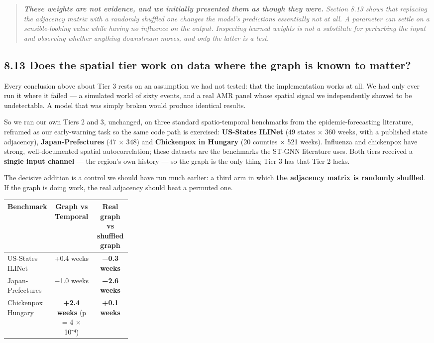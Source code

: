 \documentclass[11pt,a4paper]{article}
\begin{document}
\begin{quote}\emph{\textbf{These weights are not evidence, and we initially presented them as though they were.} Section 8.13 shows that replacing the adjacency matrix with a randomly shuffled one changes the model's \emph{predictions} essentially not at all. A parameter can settle on a sensible-looking value while having no influence on the output. Inspecting learned weights is not a substitute for perturbing the input and observing whether anything downstream moves, and only the latter is a test.}\end{quote}

\subsection*{8.13 Does the spatial tier work on data where the graph is known to matter?}

Every conclusion above about Tier 3 rests on an assumption we had not tested: that the implementation works at all. We had only ever run it where it failed — a simulated world of sixty events, and a real AMR panel whose spatial signal we independently showed to be undetectable. A model that was simply broken would produce identical results.

So we ran our own Tiers 2 and 3, unchanged, on three standard spatio-temporal benchmarks from the epidemic-forecasting literature, reframed as our early-warning task so the same code path is exercised: \textbf{US-States ILINet} (49 states × 360 weeks, with a published state adjacency), \textbf{Japan-Prefectures} (47 × 348) and \textbf{Chickenpox in Hungary} (20 counties × 521 weeks). Influenza and chickenpox have strong, well-documented spatial autocorrelation; these datasets are the benchmarks the ST-GNN literature uses. Both tiers received a \textbf{single input channel} — the region's own history — so the graph is the only thing Tier 3 has that Tier 2 lacks.

The decisive addition is a control we should have run much earlier: a third arm in which \textbf{the adjacency matrix is randomly shuffled}. If the graph is doing work, the real adjacency should beat a permuted one.

\begin{center}\small
\begin{tabular}{p{0.29\linewidth}cc}\toprule
\textbf{Benchmark} & \textbf{Graph vs Temporal} & \textbf{\textbf{Real graph vs shuffled graph}} \\ \midrule
US-States ILINet & +0.4 weeks & \textbf{−0.3 weeks} \\
Japan-Prefectures & −1.0 weeks & \textbf{−2.6 weeks} \\
Chickenpox Hungary & \textbf{+2.4 weeks} (p = 4 × 10⁻⁴) & \textbf{+0.1 weeks} \\
\bottomrule\end{tabular}
\end{center}
\end{document}

